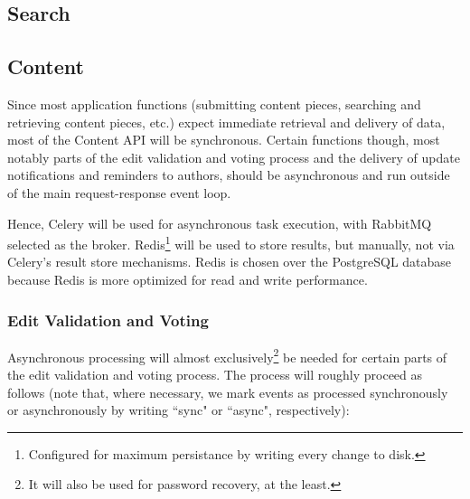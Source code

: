 \documentclass[12pt,letterpaper]{article}
\begin{document}
\subsection{Search}








\subsection{Content}


Since most application functions (submitting content pieces, searching and retrieving content pieces, etc.) expect immediate retrieval and delivery of data, most of the Content API will be synchronous. Certain functions though, most notably parts of the edit validation and voting process and the delivery of update notifications and reminders to authors, should be asynchronous and run outside of the main request-response event loop. 

Hence, Celery will be used for asynchronous task execution, with RabbitMQ selected as the broker. Redis\footnote{Configured for maximum persistance by writing every change to disk.} will be used to store results, but manually, not via Celery's result store mechanisms. Redis is chosen over the PostgreSQL database because Redis is more optimized for read and write performance.



\subsubsection{Edit Validation and Voting}

Asynchronous processing will almost exclusively\footnote{It will also be used for password recovery, at the least.} be needed for certain parts of the edit validation and voting process. The process will roughly proceed as follows (note that, where necessary, we mark events as processed synchronously or asynchronously by writing ``sync" or ``async", respectively):
\end{document}
